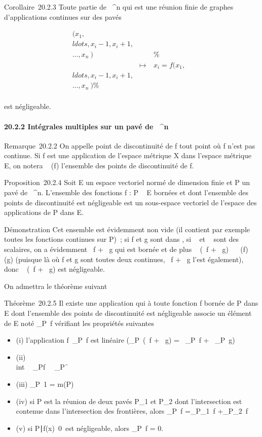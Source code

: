 \documentclass[]{article}
\begin{document}
Corollaire~20.2.3 Toute partie de ~^n qui est une réunion
finie de graphes d'applications continues sur des pavés

\begin{align*}
(x_1,\\ldots,x_i-1,x_i+1,\\\ldots,x_n~)&&
\%& \\ & \mapsto~&
x_i =
f(x_1,\\ldots,x_i-1,x_i+1,\\\ldots,x_n~)\%&
\\ \end{align*}

est négligeable.

\paragraph{20.2.2 Intégrales multiples sur un pavé de ~^n}

Remarque~20.2.2 On appelle point de discontinuité de f tout point où f
n'est pas continue. Si f est une application de l'espace métrique X dans
l'espace métrique E, on notera
\mathrmDisc~ (f) l'ensemble
des points de discontinuité de f.

Proposition~20.2.4 Soit E un espace vectoriel normé de dimension finie
et P un pavé de ~^n. L'ensemble  des fonctions f : P \rightarrow~ E
bornées et dont l'ensemble des points de discontinuité est négligeable
est un sous-espace vectoriel de l'espace des applications de P dans E.

Démonstration Cet ensemble est évidemment non vide (il contient par
exemple toutes les fonctions continues sur P)~; si f et g sont dans ,
si \alpha~ et \beta~ sont des scalaires, on a évidemment \alpha~f + \beta~g qui est bornée et
de plus \mathrmDisc~ (\alpha~f +
\beta~g) \subset~\mathrmDisc~ (f)
\cup\mathrmDisc~ (g) (puisque
là où f et g sont toutes deux continues, \alpha~f + \beta~g l'est également), donc
\mathrmDisc~ (\alpha~f + \beta~g) est
négligeable.

On admettra le théorème suivant

Théorème~20.2.5 Il existe une application qui à toute fonction f bornée
de P dans E dont l'ensemble des points de discontinuité est négligeable
associe un élément de E noté \int  _P~f
vérifiant les propriétés suivantes

\begin{itemize}
\itemsep1pt\parskip0pt
\item
  (i) l'application
  f\mapsto~\int  _P~f
  est linéaire (\int  _P~(\alpha~f + \beta~g) =
  \alpha~\int  _P~f +
  \beta~\int  _P~g)
\item
  (ii) \\int ~
  _Pf\ \leq\int ~
  _P\f\
\item
  (iii) \int  _P~1 = m(P)
\item
  (iv) si P est la réunion de deux pavés P_1 et P_2
  dont l'intersection est contenue dans l'intersection des frontières,
  alors \int  _P~f
  =\int  _P_1~f
  +\int  _P_2~f
\item
  (v) si \x \in
  P∣f(x)\mathrel\neq~0\
  est négligeable, alors \int  _P~f = 0.
\end{itemize}
\end{document}
